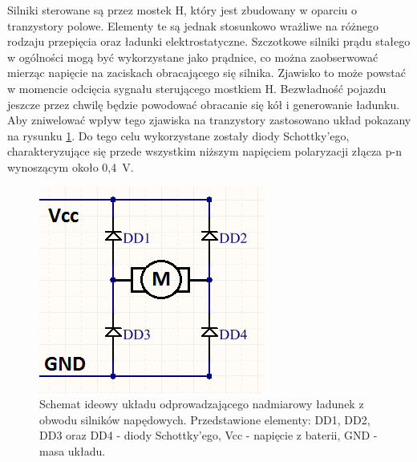   Silniki sterowane są przez mostek H, który jest zbudowany w oparciu o tranzystory polowe. Elementy te są jednak stosunkowo wrażliwe na różnego rodzaju przepięcia oraz ładunki elektrostatyczne. Szczotkowe silniki prądu stałego w ogólności mogą być wykorzystane jako prądnice, co można zaobserwować mierząc napięcie na zaciskach obracającego się silnika. Zjawisko to może powstać w momencie odcięcia sygnału sterującego mostkiem H. Bezwładność pojazdu jeszcze przez chwilę będzie powodować obracanie się kół i generowanie ładunku. Aby zniwelować wpływ tego zjawiska na tranzystory zastosowano układ pokazany na rysunku \ref{diody}. Do tego celu wykorzystane zostały diody Schottky'ego, charakteryzujące się przede wszystkim niższym napięciem polaryzacji złącza p-n wynoszącym około 0,4~V.

  \begin{figure}[H]
    \begin{center}
      \includegraphics[scale=0.7]{imgs/silnik_pol.png}
 	\caption[Podłączenie silników napędowych.]{\small{Schemat ideowy układu odprowadzającego nadmiarowy ładunek z obwodu silników napędowych. Przedstawione elementy: DD1, DD2, DD3 oraz DD4 - diody Schottky'ego, Vcc - napięcie z baterii, GND - masa układu.}}
	\label{diody}
    \end{center}
  \end{figure}   
  
